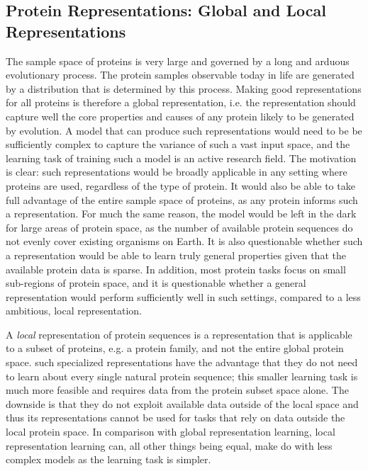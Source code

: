 \subsection{Protein Representations: Global and Local Representations}
\label{sec:global_local_representations}
The sample space of proteins is very large and governed by a long and arduous evolutionary process. The protein samples observable today in life are generated by a distribution that is determined by this process. Making good representations for all proteins is therefore a global representation, i.e. the representation should capture well the core properties and causes of any protein likely to be generated by evolution. A model that can produce such representations would need to be be sufficiently complex to capture the variance of such a vast input space, and the learning task of training such a model is an active research field. The motivation is clear: such representations would be broadly applicable in any setting where proteins are used, regardless of the type of protein. It would also be able to take full advantage of the entire sample space of proteins, as any protein informs such a representation. For much the same reason, the model would be left in the dark for large areas of protein space, as the number of available protein sequences do not evenly cover existing organisms on Earth. It is also questionable whether such a representation would be able to learn truly general properties given that the available protein data is sparse. In addition, most protein tasks focus on small sub-regions of protein space, and it is questionable whether a general representation would perform sufficiently well in such settings, compared to a less ambitious, local representation. 

A \textit{local} representation of protein sequences is a representation that is applicable to a subset of proteins, e.g. a protein family, and not the entire global protein space. such specialized representations have the advantage that they do not need to learn about every single natural protein sequence; this smaller learning task is much more feasible and requires data from the protein subset space alone. The downside is that they do not exploit available data outside of the local space and thus its representations cannot be used for tasks that rely on data outside the local protein space. In comparison with global representation learning, local representation learning can, all other things being equal, make do with less complex models as the learning task is simpler.

